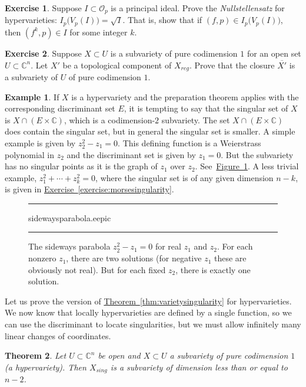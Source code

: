 \documentclass[12pt,openany]{book}
\newcommand{\C}{{\mathbb{C}}}
\newcommand{\sO}{{\mathscr{O}}}
\newcommand{\myindex}[1]{#1\index{#1}}
\theoremstyle{plain}
\newtheorem{thm}{Theorem}[section]
\theoremstyle{remark}
\theoremstyle{definition}
\newenvironment{exbox}{%
    \def\FrameCommand{\vrule width 1pt \relax\hspace{10pt}}%
    \MakeFramed{\advance\hsize-\width\FrameRestore}%
}{%
    \endMakeFramed
}
\newenvironment{myfig}{%
\begin{figure}[h!t]
\noindent\rule{\textwidth}{0.5pt}\vspace{12pt}\par\centering}%
{\par\noindent\rule{\textwidth}{0.5pt}
\end{figure}}
\theoremstyle{exercise}
\newtheorem{exercise}{Exercise}[section]
\theoremstyle{example}
\newtheorem{example}[thm]{Example}
\newcommand{\figureref}[1]{\hyperref[#1]{Figure~\ref*{#1}}}
\newcommand{\exerciseref}[1]{\hyperref[#1]{Exercise~\ref*{#1}}}
\newcommand{\thmref}[1]{\hyperref[#1]{Theorem~\ref*{#1}}}
\begin{document}
\begin{exbox}
\begin{exercise}
Suppose $I \subset \sO_p$ is a principal ideal.
Prove the
\emph{\myindex{Nullstellensatz}} for hypervarieties:
$I_p\bigl(V_p(I)\bigr) = \sqrt{I}$.  That is, show that if
$(f,p) \in I_p\bigl(V_p(I)\bigr)$, then $(f^k,p) \in I$ for some integer $k$.
\end{exercise}

\begin{exercise}
Suppose $X \subset U$ is a subvariety of pure codimension $1$ for an open set $U \subset \C^n$.
Let $X'$ be a topological component of $X_{\mathit{reg}}$.  Prove that the
closure $\overline{X'}$ is a subvariety of $U$ of pure codimension $1$.
\end{exercise}
\end{exbox}

\begin{example} \label{example:discriminantnotsingset}
If $X$ is a hypervariety and 
the preparation theorem applies with the corresponding discriminant set $E$,
it is tempting to say that the singular set of $X$ is
$X \cap (E \times \C)$, which is a codimension-$2$ subvariety.  The set
$X \cap (E \times \C)$ does contain the singular set, but in general the
singular set is smaller.
A simple example is given by
$z_2^2 - z_1 = 0$.  This defining function is a Weierstrass
polynomial in $z_2$ and the discriminant set is given by $z_1 = 0$.
But the subvariety has no singular points as it is the graph of $z_1$
over $z_2$.  See~\figureref{fig:sidewaysparabola}.
A less trivial example, $z_1^2+\cdots+z_k^2=0$,
where the singular set is of any given dimension $n-k$,
is given in
\exerciseref{exercise:morsesingularity}.

\begin{myfig}
\medskip
{sidewaysparabola.eepic}
\bigskip
\caption{The sideways parabola $z_2^2-z_1=0$ for real $z_1$ and $z_2$.
For each nonzero $z_1$, there are two solutions (for negative $z_1$ these
are obviously not real).  But for each fixed $z_2$, there is exactly
one solution.\label{fig:sidewaysparabola}}
\end{myfig}
\end{example}

Let us prove the version of \thmref{thm:varietysingularity} for
hypervarieties.
We now know that locally hypervarieties are defined by a single function,
so we can use the discriminant to locate singularities, but we must allow
infinitely many linear changes of coordinates.

\begin{thm} \label{thm:hypervarsingularity}
Let $U \subset \C^n$ be open and $X \subset U$
a subvariety of pure codimension $1$ (a hypervariety).
Then $X_{\mathit{sing}}$ is a subvariety of dimension less than or equal to
$n-2$.
\end{thm}
\end{document}
